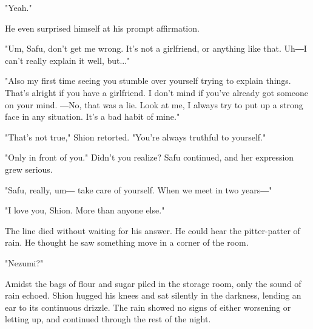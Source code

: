 "Yeah."

He even surprised himself at his prompt affirmation.

"Um, Safu, don't get me wrong. It's not a girlfriend, or anything like
that. Uh―I can't really explain it well, but..."

"Also my first time seeing you stumble over yourself trying to explain
things. That's alright if you have a girlfriend. I don't mind if you've
already got someone on your mind. ―No, that was a lie. Look at me, I
always try to put up a strong face in any situation. It's a bad habit of
mine."

"That's not true," Shion retorted. "You're always truthful to yourself."

"Only in front of you." Didn't you realize? Safu continued, and her
expression grew serious.

"Safu, really, um― take care of yourself. When we meet in two years―"

"I love you, Shion. More than anyone else."

The line died without waiting for his answer. He could hear the
pitter-patter of rain. He thought he saw something move in a corner of
the room.

"Nezumi?"

Amidst the bags of flour and sugar piled in the storage room, only the
sound of rain echoed. Shion hugged his knees and sat silently in the
darkness, lending an ear to its continuous drizzle. The rain showed no
signs of either worsening or letting up, and continued through the rest
of the night.